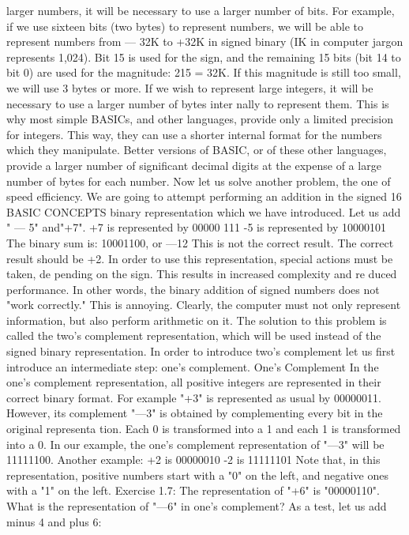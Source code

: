 larger numbers, it will be necessary to use a larger number of bits.
For example, if we use sixteen bits (two bytes) to represent
numbers, we will be able to represent numbers from — 32K to
+32K in signed binary (IK in computer jargon represents 1,024).
Bit 15 is used for the sign, and the remaining 15 bits (bit 14 to bit
0) are used for the magnitude: 215 = 32K. If this magnitude is still
too small, we will use 3 bytes or more. If we wish to represent large
integers, it will be necessary to use a larger number of bytes inter
nally to represent them. This is why most simple BASICs, and
other languages, provide only a limited precision for integers. This
way, they can use a shorter internal format for the numbers which
they manipulate. Better versions of BASIC, or of these other
languages, provide a larger number of significant decimal digits at
the expense of a large number of bytes for each number.
Now let us solve another problem, the one of speed efficiency.
We are going to attempt performing an addition in the signed
16
BASIC CONCEPTS
binary representation which we have introduced. Let us add " — 5"
and"+7".
+7 is represented by 00000 111
-5 is represented by 10000101
The binary sum is: 10001100, or —12
This is not the correct result. The correct result should be +2. In
order to use this representation, special actions must be taken, de
pending on the sign. This results in increased complexity and re
duced performance. In other words, the binary addition of signed
numbers does not "work correctly." This is annoying. Clearly, the
computer must not only represent information, but also perform
arithmetic on it.
The solution to this problem is called the two's complement
representation, which will be used instead of the signed binary
representation. In order to introduce two's complement let us first
introduce an intermediate step: one's complement.
One's Complement
In the one's complement representation, all positive integers are
represented in their correct binary format. For example "+3" is
represented as usual by 00000011. However, its complement "—3"
is obtained by complementing every bit in the original representa
tion. Each 0 is transformed into a 1 and each 1 is transformed into
a 0. In our example, the one's complement representation of "—3"
will be 11111100.
Another example:
+2 is 00000010
-2 is 11111101
Note that, in this representation, positive numbers start with a
"0" on the left, and negative ones with a "1" on the left.
Exercise 1.7: The representation of "+6" is "00000110". What is
the representation of "—6" in one's complement?
As a test, let us add minus 4 and plus 6:
